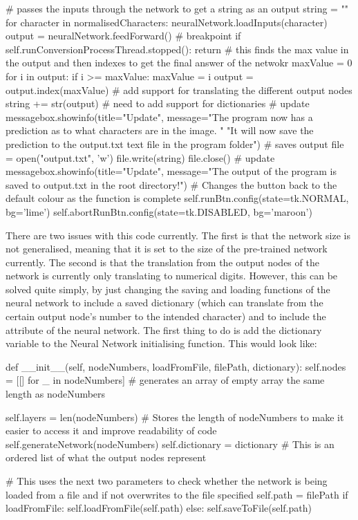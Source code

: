 \documentclass{report}
\begin{document}
\begin{python}
    # passes the inputs through the network to get a string as an output
    string = ""
    for character in normalisedCharacters:
        neuralNetwork.loadInputs(character)
        output = neuralNetwork.feedForward()
        # breakpoint
        if self.runConversionProcessThread.stopped():
            return
        # this finds the max value in the output and then indexes to get the final answer of the netwokr
        maxValue = 0
        for i in output:
            if i >= maxValue:
                maxValue = i
        output = output.index(maxValue)  # add support for translating the different output nodes
        string += str(output)  # need to add support for dictionaries
    # update
    messagebox.showinfo(title="Update",
        message="The program now has a prediction as to what characters are in the image. "
        "It will now save the prediction to the output.txt text file in the program folder")
    # saves output
    file = open("output.txt", 'w')
    file.write(string)
    file.close()
    # update
    messagebox.showinfo(title="Update",
        message="The output of the program is saved to output.txt in the root directory!")
    # Changes the button back to the default colour as the function is complete
    self.runBtn.config(state=tk.NORMAL, bg='lime')
    self.abortRunBtn.config(state=tk.DISABLED, bg='maroon')
\end{python}
There are two issues with this code currently. The first is that the network size is not generalised, meaning that it is set to the size of the pre-trained network currently. The second is that the translation from the output nodes of the network is currently only translating to numerical digits. However, this can be solved quite simply, by just changing the saving and loading functions of the neural network to include a saved dictionary (which can translate from the certain output node's number to the intended character) and to include the  attribute of the neural network.
\newline
The first thing to do is add the dictionary variable to the Neural Network initialising function. This would look like:
\begin{python}
def __init__(self, nodeNumbers, loadFromFile, filePath, dictionary):
    self.nodes = [[] for _ in nodeNumbers]  # generates an array of empty array the same length as nodeNumbers

    self.layers = len(nodeNumbers)  # Stores the length of nodeNumbers to make it easier to access it and improve readability of code
    self.generateNetwork(nodeNumbers)
    self.dictionary = dictionary # This is an ordered list of what the output nodes represent
    
    # This uses the next two parameters to check whether the network is being loaded from a file and if not overwrites to the file specified
    self.path = filePath
    if loadFromFile:
        self.loadFromFile(self.path)
    else:
        self.saveToFile(self.path)
\end{python}
\end{document}
